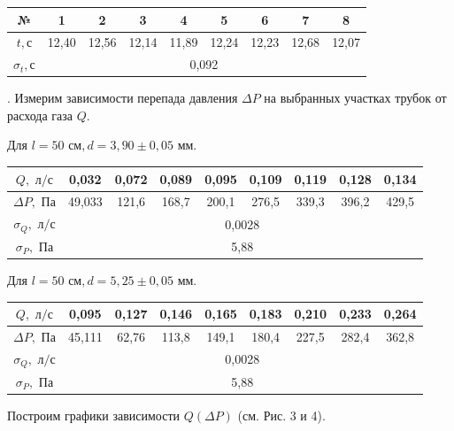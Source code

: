 \documentclass[a4paper,12pt]{article} %
\begin{document}
\begin{tabular}{|c|c|c|c|c|c|c|c|c|}
\hline 
№ & 1 & 2 & 3 & 4 & 5 & 6 & 7 & 8 \\ 
\hline 
$t, \text{с}$ & 12,40 & 12,56 & 12,14 & 11,89 & 12,24 & 12,23 & 12,68 & 12,07 \\ 
\hline 
$\sigma_t, \text{с}$ & \multicolumn{8}{c|}{0,092} \\ 
\hline 
\end{tabular} 

\medskip

\medskip

. Измерим зависимости перепада давления $ \Delta P $ на выбранных участках трубок от расхода газа $Q$.

\medskip

\noindent Для $l = 50 \text{ см}, d = 3,90 \pm 0,05 \text{ мм}$.

\medskip
\medskip

\begin{tabular}{|c|c|c|c|c|c|c|c|c|}
\hline 
$Q, \text{ л/с}$ & 0,032 & 0,072 & 0,089 & 0,095 & 0,109 & 0,119 & 0,128 & 0,134 \\ 
\hline 
$\Delta P, \text{ Па}$ & 49,033 & 121,6 & 168,7 & 200,1 & 276,5 & 339,3 & 396,2 & 429,5 \\ 
\hline 
$\sigma_Q, \text{ л/с}$ & \multicolumn{8}{c|}{0,0028
} \\ 
\hline 
$\sigma_P, \text{ Па}$ & \multicolumn{8}{c|}{5,88} \\ 
\hline 
\end{tabular} 

\medskip
\medskip

\noindent Для $l = 50 \text{ см}, d = 5,25 \pm 0,05 \text{ мм}$.

\medskip
\medskip

\begin{tabular}{|c|c|c|c|c|c|c|c|c|}
\hline 
$Q, \text{ л/с}$ & 0,095 & 0,127 & 0,146 & 0,165 & 0,183 & 0,210 & 0,233 & 0,264 \\ 
\hline 
$\Delta P, \text{ Па}$ & 45,111 & 62,76 & 113,8 & 149,1 & 180,4 & 227,5 & 282,4 & 362,8 \\ 
\hline 
$\sigma_Q, \text{ л/с}$ & \multicolumn{8}{c|}{0,0028
} \\ 
\hline 
$\sigma_P, \text{ Па}$ & \multicolumn{8}{c|}{5,88} \\ 
\hline 
\end{tabular} 

\medskip
\medskip

\noindent Построим графики зависимости $Q(\Delta P)$ (см. Рис. 3 и 4).
\end{document}
